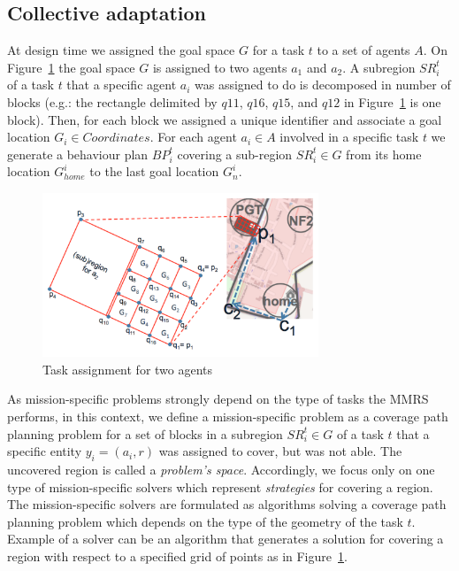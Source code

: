 \documentclass[journal]{IEEEtran}
\theoremstyle{definition}
\begin{document}
\subsection{Collective adaptation}
At design time we assigned the goal space $G$ for a task $t$ to a set of agents $A$. On Figure~\ref{Fig:Synthesis} the goal space $G$ is assigned to two agents $a_1$ and $a_2$. A subregion $SR^t_i$ of a task $t$ that a specific agent $a_i$  was assigned to do is decomposed in number of blocks (e.g.: the rectangle delimited by $q11$, $q16$, $q15$, and $q12$ in Figure~\ref{Fig:Synthesis} is one block).
Then, for each block we assigned a unique identifier and associate a goal location $G_i \in Coordinates$. 
For each agent $a_i \in A$ involved in a specific task $t$ we generate a  behaviour plan $BP^t_i$ covering a sub-region $SR^t_i \in G$ from its home location $G^i_{home}$ to the last goal location $G^i_n$. 

\begin{figure}[h]
\includegraphics[width=3.25in]{Figures/Synthesis2.png}
\caption{Task assignment for two agents}\label{Fig:Synthesis}
\end{figure}



 As mission-specific problems strongly depend on the type of tasks the MMRS performs, in this context, we define a mission-specific problem as a coverage path planning problem for a set of blocks in a subregion $SR^t_i \in G$ of a task $t$ that a specific entity $y_i=(a_i,r)$  was assigned to cover, but was not able. The uncovered region is called a \textit{problem's space}.
Accordingly, we focus only on one type of mission-specific solvers which represent \textit{strategies} for covering a region. The mission-specific solvers are formulated as algorithms solving a coverage path planning problem which depends on the type of the geometry of the task $t$. Example of a solver can be an algorithm that generates a solution for covering a region with respect to a specified grid of points as in Figure~\ref{Fig:Synthesis}.
\end{document}

